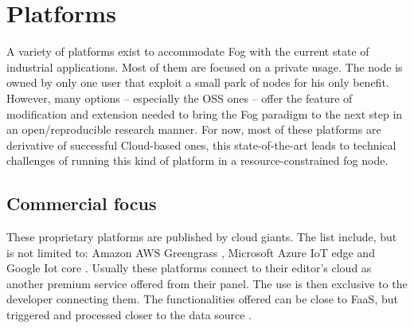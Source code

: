 \documentclass[11pt]{sdm}
\begin{document}
\section{Platforms}

A variety of platforms exist to accommodate Fog with the current state of industrial applications. Most of them are focused on a private usage. The node is owned by only one user that exploit a small park of nodes for his only benefit. However, many options -- especially the \gls{OSS} ones -- offer the feature of modification and extension needed to bring the Fog paradigm to the next step in an open/reproducible research manner. For now, most of these platforms are derivative of successful Cloud-based ones, this state-of-the-art leads to technical challenges of running this kind of platform in a resource-constrained fog node.



\subsection{Commercial focus}

These proprietary platforms are published by cloud giants. The list include, but is not limited to: Amazon AWS Greengrass \cite{noauthor_aws_nodate}, Microsoft Azure IoT edge \cite{noauthor_iot_nodate} and Google Iot core \cite{noauthor_cloud_nodate}. Usually these platforms connect to their editor's cloud as another premium service offered from their panel. The use is then exclusive to the developer connecting them. The functionalities offered can be close to \gls{FaaS}, but triggered and processed closer to the data source \cite{elgamal_costless_2018}.
\end{document}
